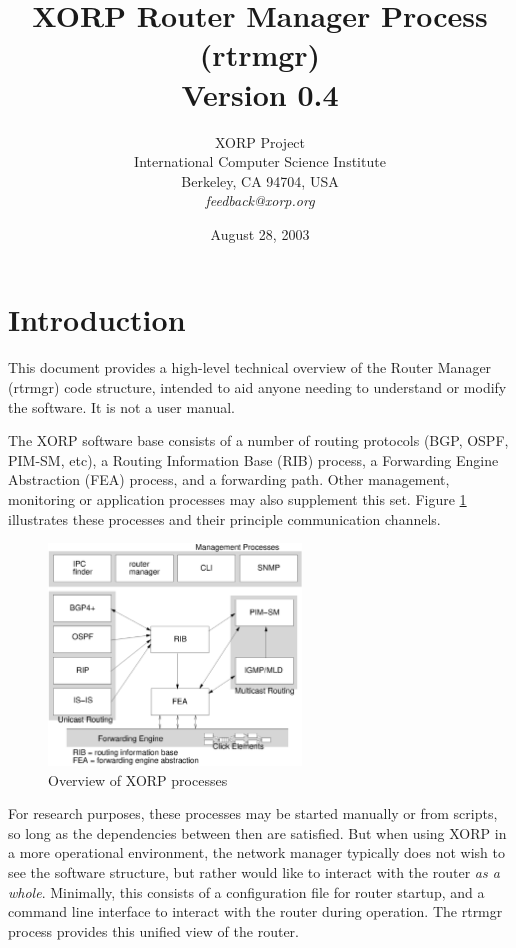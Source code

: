\documentclass[11pt]{article}
\title{XORP Router Manager Process (rtrmgr) \\
\vspace{1ex}
Version 0.4}
\author{ XORP Project					\\
	 International Computer Science Institute	\\
	 Berkeley, CA 94704, USA			\\
	 {\it feedback@xorp.org}
}
\date{August 28, 2003}
\begin{document}
\maketitle                            
\section{Introduction}
This document provides a high-level technical overview of the Router
Manager (rtrmgr) code structure, intended to aid anyone needing to
understand or modify the software.   It is not a user manual.

The XORP software base consists of a number of routing protocols (BGP,
OSPF, PIM-SM, etc), a Routing Information Base (RIB) process, a
Forwarding Engine Abstraction (FEA) process, and a forwarding path.
Other management, monitoring or application processes may also
supplement this set.  Figure \ref{overview} illustrates these
processes and their principle communication channels.

\begin{figure}[htb]
\centerline{\includegraphics[width=0.6\textwidth]{figs/processes3}}
\vspace{.05in}
\caption{\label{overview}Overview of XORP processes}
\end{figure}

For research purposes, these processes may be started manually or from
scripts, so long as the dependencies between then are satisfied.  But
when using XORP in a more operational environment, the network manager
typically does not wish to see the software structure, but rather
would like to interact with the router {\it as a whole}.  Minimally, this
consists of a configuration file for router startup, and a command
line interface to interact with the router during operation.  The
rtrmgr process provides this unified view of the router.
\end{document}
